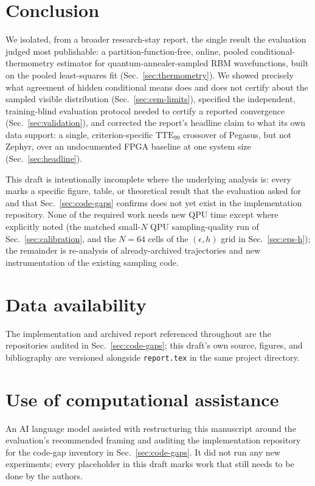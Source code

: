 \section{Conclusion}
\label{sec:conclusion}

We isolated, from a broader research-stay report, the single result the evaluation judged most publishable: a partition-function-free, online, pooled conditional-thermometry estimator for quantum-annealer-sampled RBM wavefunctions, built on the pooled least-squares fit (Sec.~\ref{sec:thermometry}). We showed precisely what agreement of hidden conditional means does and does not certify about the sampled visible distribution (Sec.~\ref{sec:cem-limits}), specified the independent, training-blind evaluation protocol needed to certify a reported convergence (Sec.~\ref{sec:validation}), and corrected the report's headline claim to what its own data support: a single, criterion-specific $\mathrm{TTE}_{99}$ crossover of Pegasus, but not Zephyr, over an undocumented FPGA baseline at one system size (Sec.~\ref{sec:headline}).

This draft is intentionally incomplete where the underlying analysis is: every  marks a specific figure, table, or theoretical result that the evaluation asked for and that Sec.~\ref{sec:code-gaps} confirms does not yet exist in the implementation repository. None of the required work needs new QPU time except where explicitly noted (the matched small-$N$ QPU sampling-quality run of Sec.~\ref{sec:calibration}, and the $N=64$ cells of the $(\epsilon,h)$ grid in Sec.~\ref{sec:eps-h}); the remainder is re-analysis of already-archived trajectories and new instrumentation of the existing sampling code.

\section*{Data availability}
The implementation and archived report referenced throughout are the repositories audited in Sec.~\ref{sec:code-gaps}; this draft's own source, figures, and bibliography are versioned alongside \texttt{report.tex} in the same project directory. 

\section*{Use of computational assistance}
An AI language model assisted with restructuring this manuscript around the evaluation's recommended framing and auditing the implementation repository for the code-gap inventory in Sec.~\ref{sec:code-gaps}. It did not run any new experiments; every placeholder in this draft marks work that still needs to be done by the authors.
